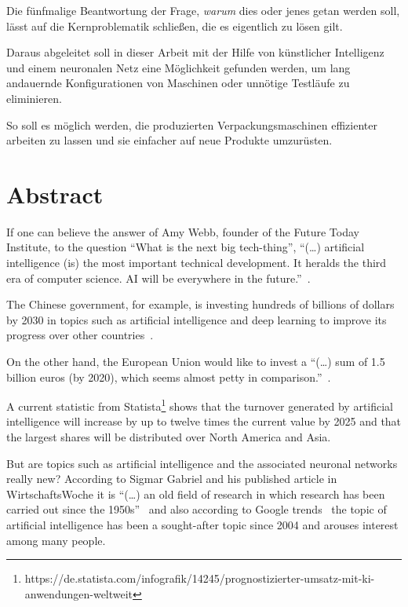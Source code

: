 Die fünfmalige Beantwortung der Frage, \textit{warum} dies oder jenes getan werden soll, lässt auf die Kernproblematik
schließen, die es eigentlich zu lösen gilt.

Daraus abgeleitet soll in dieser Arbeit mit der Hilfe von künstlicher Intelligenz und einem neuronalen Netz eine
Möglichkeit gefunden werden, um lang andauernde Konfigurationen von Maschinen oder unnötige Testläufe zu eliminieren.

So soll es möglich werden, die produzierten Verpackungsmaschinen effizienter arbeiten zu lassen und sie einfacher auf
neue Produkte umzurüsten.

\newpage

\section{Abstract}
\label{sec:abstract}
If one can believe the answer of Amy Webb, founder of the Future Today Institute, to the question ``What is the
next big tech-thing'', ``(\ldots) artificial intelligence (is) the most important technical development. It
heralds the third era of computer science. AI will be everywhere in the future.''~\cite{article_einleitung_dub_aw}.

The Chinese government, for example, is investing hundreds of billions of dollars by 2030 in topics such as artificial
intelligence and deep learning to improve its progress over other countries~\cite{article_einleitung_css}.

On the other hand, the European Union would like to invest a ``(\ldots) sum of 1.5 billion euros (by 2020),
which seems almost petty in comparison.''~\cite{article_einleitung_ww_sg}.

A current statistic from
Statista\footnote{https://de.statista.com/infografik/14245/prognostizierter-umsatz-mit-ki-anwendungen-weltweit} shows
that the turnover generated by artificial intelligence will increase by up to twelve times the current value by 2025
and that the largest shares will be distributed over North America and Asia.

But are topics such as artificial intelligence and the associated neuronal networks really new? According to Sigmar
Gabriel and his published article in WirtschaftsWoche it is ``(\ldots) an old field of research in which
research has been carried out since the 1950s''~\cite{article_einleitung_ww_sg} and also according to Google
trends~\cite{online_einleitung_googletrends} the topic of artificial intelligence has been a sought-after topic since
2004 and arouses interest among many people.

